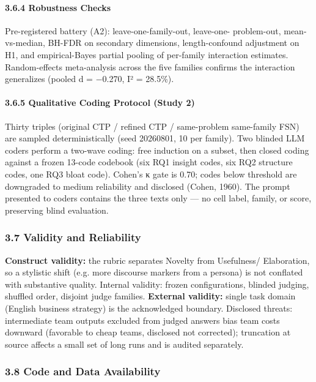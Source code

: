 \documentclass[11pt,a4paper]{article}
\begin{document}
\paragraph{3.6.4 Robustness Checks}

Pre-registered battery (A2): leave-one-family-out, leave-one-
problem-out, mean-vs-median, BH-FDR on secondary dimensions,
length-confound adjustment on H1, and empirical-Bayes partial
pooling of per-family interaction estimates. Random-effects
meta-analysis across the five families confirms the interaction
generalizes (pooled d = −0.270, I² = 28.5\%).

\paragraph{3.6.5 Qualitative Coding Protocol (Study 2)}

Thirty triples (original CTP / refined CTP / same-problem same-family
FSN) are sampled deterministically (seed 20260801, 10 per family).
Two blinded LLM coders perform a two-wave coding: free induction on
a subset, then closed coding against a frozen 13-code codebook
(six RQ1 insight codes, six RQ2 structure codes, one RQ3 bloat code).
Cohen's κ gate is 0.70; codes below threshold are downgraded to
medium reliability and disclosed (Cohen, 1960). The prompt presented
to coders contains the three texts only — no cell label, family, or
score, preserving blind evaluation.

\subsubsection{3.7 Validity and Reliability}

\textbf{Construct validity:} the rubric separates Novelty from Usefulness/
Elaboration, so a stylistic shift (e.g. more discourse markers from a
persona) is not conflated with substantive quality. \textit{}Internal
validity:\textit{} frozen configurations, blinded judging, shuffled order,
disjoint judge families. \textbf{External validity:} single task domain
(English business strategy) is the acknowledged boundary. \textit{}Disclosed
threats:\textit{} intermediate team outputs excluded from judged answers bias
team costs downward (favorable to cheap teams, disclosed not
corrected); truncation at source affects a small set of long runs and
is audited separately.

\subsubsection{3.8 Code and Data Availability}
\end{document}
